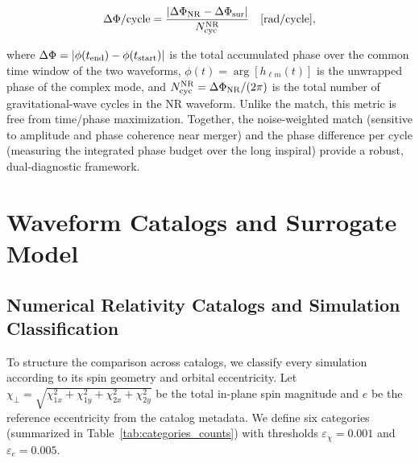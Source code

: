 \documentclass[%
 reprint,
superscriptaddress,
 amsmath,amssymb,
 aps,
]{revtex4-2}
\begin{document}
\begin{equation}\Delta\Phi/{\rm cycle} = \frac{|\Delta\Phi_{\rm NR} - \Delta\Phi_{\rm sur}|}{N_{\rm cyc}^{\rm NR}}\quad [\mathrm{rad/cycle}],\end{equation}

where $\Delta\Phi = |\phi(t_{\rm end}) - \phi(t_{\rm start})|$ is the total accumulated phase over the common time window of the two waveforms, $\phi(t) = \arg[h_{\ell m}(t)]$ is the unwrapped phase of the complex mode, and $N_{\rm cyc}^{\rm NR} = \Delta\Phi_{\rm NR} / (2\pi)$ is the total number of gravitational-wave cycles in the NR waveform. Unlike the match, this metric is free from time/phase maximization. Together, the noise-weighted match (sensitive to amplitude and phase coherence near merger) and the phase difference per cycle (measuring the integrated phase budget over the long inspiral) provide a robust, dual-diagnostic framework.


\section{Waveform Catalogs and Surrogate Model}

\subsection{Numerical Relativity Catalogs and Simulation Classification}

To structure the comparison across catalogs, we classify every simulation according to its spin geometry and orbital eccentricity.  Let $\chi_\perp = \sqrt{\chi_{1x}^2 + \chi_{1y}^2 + \chi_{2x}^2 + \chi_{2y}^2}$ be the total in-plane spin magnitude and $e$ be the reference eccentricity from the catalog metadata.  We define six categories (summarized in Table~\ref{tab:categories_counts}) with thresholds $\varepsilon_\chi = 0.001$ and $\varepsilon_e = 0.005$.
\end{document}
